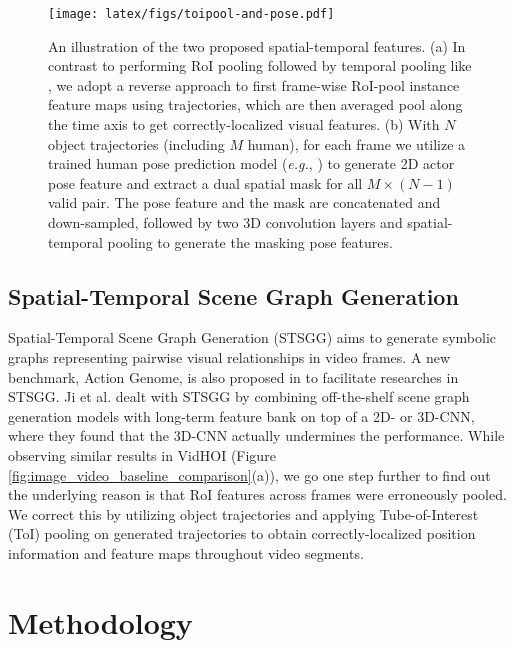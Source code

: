 \documentclass[sigconf]{acmart}
\begin{document}
\begin{figure*}[t!]
\centering
\texttt{[image: latex/figs/toipool-and-pose.pdf]}
\vspace{-1em}
\caption{An illustration of the two proposed spatial-temporal features.
(a) In contrast to performing RoI pooling followed by temporal pooling like \cite{wu2019long,feichtenhofer2019slowfast}, we adopt a reverse approach to first frame-wise RoI-pool instance feature maps using trajectories, which are then averaged pool along the time axis to get correctly-localized visual features. 
(b) With $N$ object trajectories (including $M$ human), for each frame we utilize a trained human pose prediction model (\emph{e.g.}, \cite{fang2017rmpe}) to generate 2D actor pose feature and extract a dual spatial mask for all $M \times (N-1)$ valid pair. 
The pose feature and the mask are concatenated and down-sampled, followed by two 3D convolution layers and spatial-temporal pooling to generate the masking pose features.
}
\label{fig:toipool_and_pose}
\vspace{-0.5em}
\end{figure*}

\subsection{Spatial-Temporal Scene Graph Generation}
\label{subsec:stsgg}

Spatial-Temporal Scene Graph Generation (STSGG) \cite{ji2020action} aims to generate symbolic graphs representing pairwise visual relationships in video frames.
A new benchmark, Action Genome, is also proposed in \cite{ji2020action} to facilitate researches in STSGG.
Ji et al. \cite{ji2020action} dealt with STSGG by combining off-the-shelf scene graph generation models with long-term feature bank \cite{wu2019long} on top of a 2D- or 3D-CNN, where they found that the 3D-CNN actually undermines the performance.
While observing similar results in VidHOI (Figure \ref{fig:image_video_baseline_comparison}(a)), we go one step further to find out the underlying reason is that RoI features across frames were erroneously pooled.
We correct this by utilizing object trajectories and applying Tube-of-Interest (ToI) pooling on generated trajectories to obtain correctly-localized position information and feature maps throughout video segments.



\section{Methodology}
\label{sec:methodology}
\end{document}

